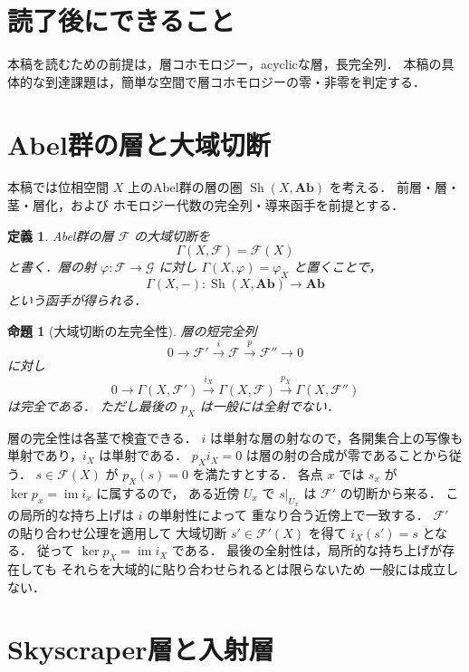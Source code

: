 \documentclass[a5paper,10pt,onecolumn]{jsarticle}
\makeatletter
\theoremstyle{mathnotetheorem}
\newtheorem{definition}[theorem]{定義}
\newtheorem{proposition}[theorem]{命題}
\renewcommand{\proofname}{証明}
\renewenvironment{proof}[1][\proofname]{%
  \par\pushQED{\qed}\normalfont\topsep4\p@\@plus2\p@\relax
  \trivlist\item[\hskip\labelsep\bfseries #1]\ignorespaces
}{\popQED\endtrivlist\@endpefalse}
\makeatother
\begin{document}
\section*{読了後にできること}
本稿を読むための前提は，層コホモロジー，acyclicな層，長完全列．
本稿の具体的な到達課題は，簡単な空間で層コホモロジーの零・非零を判定する．

\section{Abel群の層と大域切断}

本稿では位相空間 $X$ 上のAbel群の層の圏
$\operatorname{Sh}(X,\mathbf{Ab})$ を考える．
前層・層・茎・層化，および
ホモロジー代数の完全列・導来函手を前提とする．

\begin{definition}
Abel群の層 $\mathcal F$ の大域切断を
\[
 \Gamma(X,\mathcal F)=\mathcal F(X)
\]
と書く．層の射
$\varphi:\mathcal F\to\mathcal G$ に対し
$\Gamma(X,\varphi)=\varphi_X$ と置くことで，
\[
 \Gamma(X,-):\operatorname{Sh}(X,\mathbf{Ab})
 \longrightarrow\mathbf{Ab}
\]
という函手が得られる．
\end{definition}

\begin{proposition}[大域切断の左完全性]
\label{prop:global-left}
層の短完全列
\[
 0\to\mathcal F'\xrightarrow{i}\mathcal F
 \xrightarrow{p}\mathcal F''\to0
\]
に対し
\[
 0\to\Gamma(X,\mathcal F')
 \xrightarrow{i_X}\Gamma(X,\mathcal F)
 \xrightarrow{p_X}\Gamma(X,\mathcal F'')
\]
は完全である．
ただし最後の $p_X$ は一般には全射でない．
\end{proposition}
\begin{proof}
層の完全性は各茎で検査できる．
$i$ は単射な層の射なので，各開集合上の写像も
単射であり，$i_X$ は単射である．
$p_Xi_X=0$ は層の射の合成が零であることから従う．
$s\in\mathcal F(X)$ が $p_X(s)=0$ を満たすとする．
各点 $x$ では $s_x$ が
$\ker p_x=\operatorname{im}i_x$ に属するので，
ある近傍 $U_x$ で $s|_{U_x}$ は
$\mathcal F'$ の切断から来る．
この局所的な持ち上げは $i$ の単射性によって
重なり合う近傍上で一致する．
$\mathcal F'$ の貼り合わせ公理を適用して
大域切断 $s'\in\mathcal F'(X)$ を得て
$i_X(s')=s$ となる．
従って $\ker p_X=\operatorname{im}i_X$ である．
最後の全射性は，局所的な持ち上げが存在しても
それらを大域的に貼り合わせられるとは限らないため
一般には成立しない．
\end{proof}

\section{Skyscraper層と入射層}
\end{document}
